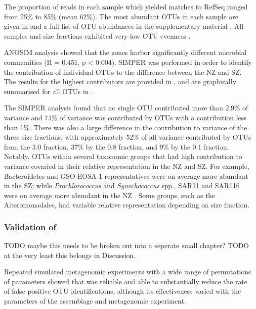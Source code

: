 The proportion of reads in each sample which yielded matches to RefSeq ranged from 25\% to 85\% (mean 62\%).
The most abundant \acp{OTU} in each sample are given in  and a full list of \ac{OTU} abundances in the supplementary material .
All samples and size fractions exhibited very low \ac{OTU} evenness .




\ac{ANOSIM} analysis showed that the zones harbor significantly different microbial communities (R = 0.451, p < 0.004). 
\ac{SIMPER} was performed in order to identify the contribution of individual \acp{OTU} to the difference between the \ac{NZ} and \ac{SZ}. 
The results for the highest contributors are provided in , and are graphically summarised for all \acp{OTU} in .




The \ac{SIMPER} analysis found that no single \ac{OTU} contributed more than 2.9\% of variance and 74\% of variance was contributed by \acp{OTU} with a contribution less than 1\%. 
There was also a large difference in the contribution to variance of the three size fractions, with approximately 52\% of all variance contributed by \acp{OTU} from the 3.0 \micron{} fraction, 37\% by the 0.8 \micron{} fraction, and 9\% by the 0.1 \micron{} fraction.
Notably, \acp{OTU} within several taxonomic groups that had high contribution to variance covaried in their relative representation in the \ac{NZ} and \ac{SZ}.
For example, Bacteroidetes and GSO-EOSA-1 representatives were on average more abundant in the \ac{SZ}; while \emph{Prochlorococcus} and \emph{Synechococcus} spp., SAR11 and SAR116 were on average more abundant in the \ac{NZ} .
Some groups, such as the Alteromonadales, had variable relative representation depending on size fraction.

\subsubsection{Validation of }
TODO maybe this needs to be broken out into a seperate small chapter?
TODO at the very least this belongs in Discussion.

Repeated simulated metagenomic experiments with a wide range of permutations of parameters showed that  was reliable and able to substantially reduce the rate of false positive \ac{OTU} identifications, although its effectiveness varied with the parameters of the assemblage and metagenomic experiment.

